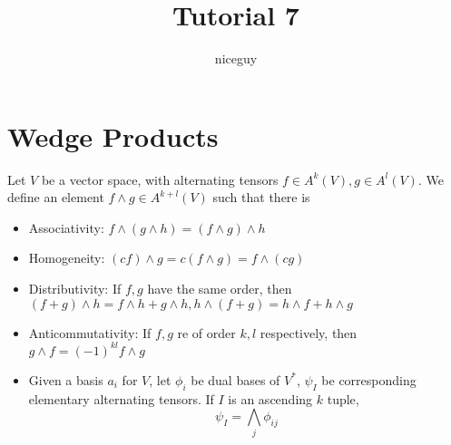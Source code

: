\documentclass[12pt]{article}
\title{Tutorial 7}
\author{niceguy}
\begin{document}
\maketitle

\section{Wedge Products}

\begin{thm}
    Let $V$ be a vector space, with alternating tensors $f \in A^k(V), g \in A^l(V)$. We define an element $f \wedge g \in A^{k+l}(V)$ such that there is
    \begin{itemize}
        \item Associativity: $f \wedge (g \wedge h) = (f \wedge g) \wedge h$
        \item Homogeneity: $(cf) \wedge g = c(f \wedge g) = f \wedge (cg)$
        \item Distributivity: If $f,g$ have the same order, then $(f + g) \wedge h = f \wedge h + g \wedge h, h \wedge (f + g) = h \wedge f + h \wedge g$
        \item Anticommutativity: If $f,g$ re of order $k,l$ respectively, then $g \wedge f = (-1)^{kl} f \wedge g$
        \item Given a basis $a_i$ for $V$, let $\phi_i$ be dual bases of $V^*$, $\psi_I$ be corresponding elementary alternating tensors. If $I$ is an ascending $k$ tuple,
            $$\psi_I = \bigwedge_j \phi_{ij}$$
    \end{itemize}
\end{thm}
\end{document}
